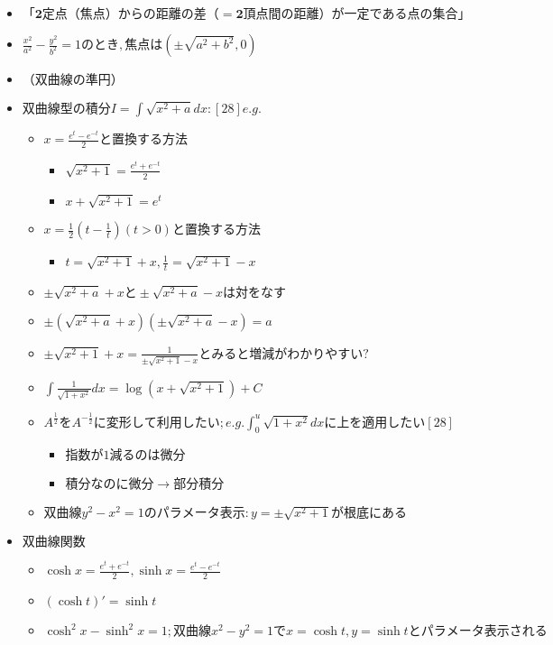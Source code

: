 \documentclass[dvipdfmx,uplatex]{jsarticle}
\begin{document}
\begin{itemize}
\begin{itemize}
		\item $ \bm{「2定点（焦点）からの距離の差（=2頂点間の距離）が一定である点の集合」}$
		\item $ \frac{x^2}{a^2}- \frac{y^2}{b^2}=1のとき,焦点は( \pm \sqrt{a^2+b^2},0)$
		\item $ （双曲線の準円）$
		\item $ 双曲線型の積分I= \int \sqrt{x^2+a}dx:[28]e.g.$
		\begin{itemize}
			\item $ x= \frac{e^t - e^{-t}}{2}と置換する方法$
			\begin{itemize}
				\item $ \sqrt{x^2+1} = \frac{e^t + e^{-t}}{2}$
				\item $ x + \sqrt{x^2+1} = e^t$
			\end{itemize}
			\item $ x= \frac{1}{2} \left( t - \frac{1}{t} \right)(t > 0)と置換する方法$
			\begin{itemize}
				\item $ t = \sqrt{x^2+1} + x, \frac{1}{t} = \sqrt{x^2+1} - x$
			\end{itemize}
			\item $ \pm \sqrt{x^2+a}+xと\pm \sqrt{x^2+a}-xは対をなす$
			\item $ \pm (\sqrt{x^2+a}+x)(\pm \sqrt{x^2+a}-x) = a$
			\item $ \pm \sqrt{x^2+1}+x = \frac{1}{\pm \sqrt{x^2+1}-x}とみると増減がわかりやすい?$
			\item $ \int \frac{1}{\sqrt{1+x^2}}dx = \log(x+ \sqrt{x^2+1}) + C$
			\item $ A^{\frac{1}{2}}をA^{-\frac{1}{2}}に変形して利用したい;e.g. \int^u_0 \sqrt{1+x^2}dxに上を適用したい[28]$
			\begin{itemize}
				\item $ 指数が1減るのは微分$
				\item $ 積分なのに微分 \rightarrow 部分積分$
			\end{itemize}
			\item $ 双曲線y^2-x^2=1のパラメータ表示:y = \pm \sqrt{x^2+1}が根底にある$
		\end{itemize}
		\item $ 双曲線関数$
		\begin{itemize}
			\item $ \cosh x = \frac{e^t + e^{-t}}{2}, \sinh x = \frac{e^t - e^{-t}}{2}$
			\item $ (\cosh t)' = \sinh t$
			\item $ \cosh^{2} x - \sinh^{2} x = 1;双曲線x^2-y^2=1でx= \cosh t,y= \sinh tとパラメータ表示される$

\end{itemize}
\end{itemize}
\end{itemize}
\end{document}
